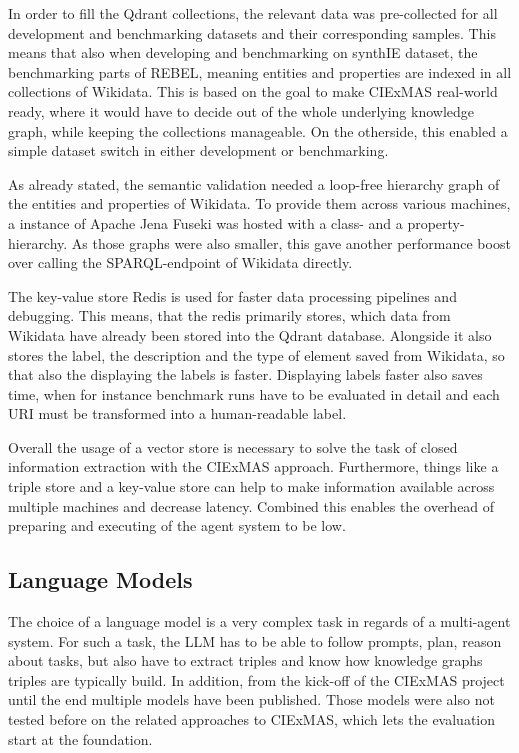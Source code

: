 \documentclass[a4paper,oneside,bibliography=totoc]{scrbook}
\begin{document}
In order to fill the Qdrant collections, the relevant data was pre-collected for all development and benchmarking datasets and their corresponding samples. This means that also when developing and benchmarking on synthIE dataset, the benchmarking parts of REBEL, meaning entities and properties are indexed in all collections of Wikidata. This is based on the goal to make CIExMAS real-world ready, where it would have to decide out of the whole underlying knowledge graph, while keeping the collections manageable. On the otherside, this enabled a simple dataset switch in either development or benchmarking.

As already stated, the semantic validation needed a loop-free hierarchy graph of the entities and properties of Wikidata. To provide them across various machines, a instance of Apache Jena Fuseki was hosted with a class- and a property-hierarchy. As those graphs were also smaller, this gave another performance boost over calling the SPARQL-endpoint of Wikidata directly.

The key-value store Redis is used for faster data processing pipelines and debugging. This means, that the redis primarily stores, which data from Wikidata have already been stored into the Qdrant database. Alongside it also stores the label, the description and the type of element saved from Wikidata, so that also the displaying the labels is faster. Displaying labels faster also saves time, when for instance benchmark runs have to be evaluated in detail and each URI must be transformed into a human-readable label.

Overall the usage of a vector store is necessary to solve the task of closed information extraction with the CIExMAS approach. Furthermore, things like a triple store and a key-value store can help to make information available across multiple machines and decrease latency. Combined this enables the overhead of preparing and executing of the agent system to be low.

\subsection{Language Models}
\label{subsec:eval_language_models}

The choice of a language model is a very complex task in regards of a multi-agent system. For such a task, the \ac{LLM} has to be able to follow prompts, plan, reason about tasks, but also have to extract triples and know how knowledge graphs triples are typically build. In addition, from the kick-off of the CIExMAS project until the end multiple models have been published. Those models were also not tested before on the related approaches to CIExMAS, which lets the evaluation start at the foundation.
\end{document}
